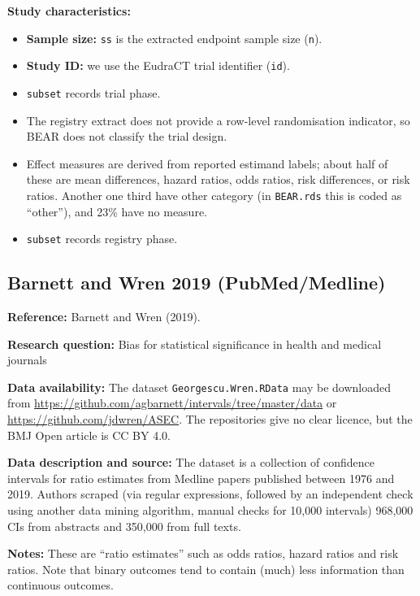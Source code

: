 \documentclass[
  11pt,
]{article}
\begin{document}
\textbf{Study characteristics:}

\begin{itemize}
\item
  \textbf{Sample size:} \texttt{ss} is the extracted endpoint sample
  size (\texttt{n}).
\item
  \textbf{Study ID:} we use the EudraCT trial identifier (\texttt{id}).
\item
  \texttt{subset} records trial phase.
\item
  The registry extract does not provide a row-level randomisation
  indicator, so BEAR does not classify the trial design.
\item
  Effect measures are derived from reported estimand labels; about half
  of these are mean differences, hazard ratios, odds ratios, risk
  differences, or risk ratios. Another one third have other category (in
  \texttt{BEAR.rds} this is coded as ``other''), and 23\% have no
  measure.
\item
  \texttt{subset} records registry phase.
\end{itemize}

\newpage

\subsection{Barnett and Wren 2019
(PubMed/Medline)}\label{barnett-and-wren-2019-pubmedmedline}

\textbf{Reference:} Barnett and Wren (2019).

\textbf{Research question:} Bias for statistical significance in health
and medical journals

\textbf{Data availability:} The dataset \texttt{Georgescu.Wren.RData}
may be downloaded from
\url{https://github.com/agbarnett/intervals/tree/master/data} or
\url{https://github.com/jdwren/ASEC}. The repositories give no clear
licence, but the BMJ Open article is CC BY 4.0.

\textbf{Data description and source:} The dataset is a collection of
confidence intervals for ratio estimates from Medline papers published
between 1976 and 2019. Authors scraped (via regular expressions,
followed by an independent check using another data mining algorithm,
manual checks for 10,000 intervals) 968,000 CIs from abstracts and
350,000 from full texts.

\textbf{Notes:} These are ``ratio estimates'' such as odds ratios,
hazard ratios and risk ratios. Note that binary outcomes tend to contain
(much) less information than continuous outcomes.
\end{document}
